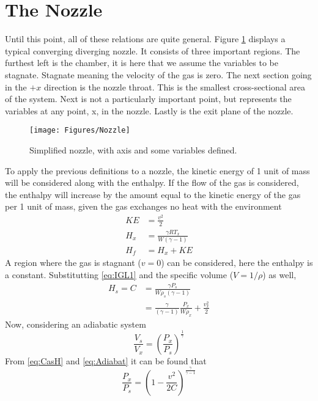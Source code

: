 \section{The Nozzle}\label{sec:TheNozzle}
Until this point, all of these relations are quite general. Figure \ref{fig:Nozzle} displays a typical converging diverging nozzle. It consists of three important regions. The furthest left is the chamber, it is here that we assume the variables to be stagnate. Stagnate meaning the velocity of the gas is zero. The next section going in the $+x$ direction is the nozzle throat. This is the smallest cross-sectional area of the system. Next is not a particularly important point, but represents the variables at any point, x, in the nozzle. Lastly is the exit plane of the nozzle. 
\begin{figure}[h!]
\centering
\texttt{[image: Figures/Nozzle]}
\caption{Simplified nozzle, with axis and some variables defined.}
\label{fig:Nozzle}
\end{figure}
To apply the previous definitions to a nozzle, the kinetic energy of 1 unit of mass will be considered along with the enthalpy. If the flow of the gas is considered, the enthalpy will increase by the amount equal to the kinetic energy of the gas per 1 unit of mass, given the gas exchanges no heat with the environment
\begin{align}
KE&=\frac{v^2}{2}\\
H_x&=\frac{\gamma RT_x}{W(\gamma-1)}\\
H_f&=H_x + KE
\end{align}%
A region where the gas is stagnant ($v=0$) can be considered, here the enthalpy is a constant. Substitutting \ref{eq:IGL1} and the specific volume ($V=1/\rho$) as well,
\begin{align}\label{eq:CasH}
H_s=C&=\frac{\gamma P_s}{W\rho_s(\gamma-1)}\\
&=\frac{\gamma}{(\gamma-1)}\frac{P_x}{W\rho_x}+\frac{v_x^2}{2}
\end{align}%
Now, considering an adiabatic system
\begin{equation}\label{eq:Adiabat}
\frac{V_s}{V_x}=\left(\frac{P_x}{P_s}\right)^{\frac{1}{\gamma}}
\end{equation}
From \ref{eq:CasH} and \ref{eq:Adiabat} it can be found that
\begin{equation}\label{eq:1.20}
\frac{P_x}{P_s}=\left(1-\frac{v^2}{2C}\right)^{\frac{\gamma}{\gamma-1}}
\end{equation}
